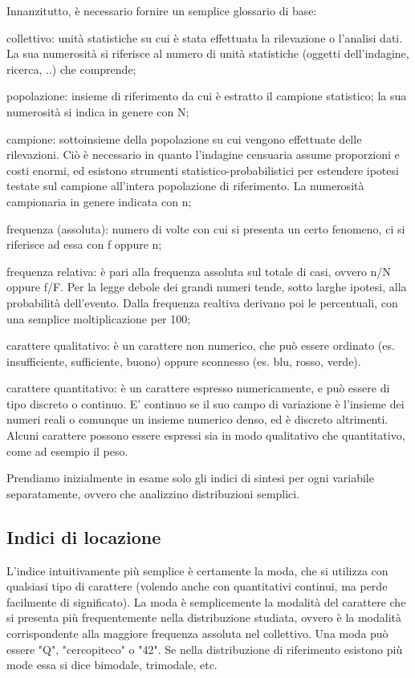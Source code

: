 \documentclass[a4paper]{article}
\begin{document}
Innanzitutto, \`{e} necessario fornire un semplice glossario di base:
\begin{list}{*}{}
\item collettivo: unit\`{a} statistiche su cui \`{e} stata effettuata la rilevazione o l'analisi dati. La sua numerosit\`{a} si riferisce al numero di unit\`{a} statistiche (oggetti dell'indagine, ricerca, ..) che comprende;
\item popolazione: insieme di riferimento da cui \`{e} estratto il campione statistico; la sua numerosit\`{a} si indica in genere con N;
\item campione: sottoinsieme della popolazione su cui vengono effettuate delle rilevazioni. Ciò \`{e} necessario in quanto l'indagine censuaria assume proporzioni e costi enormi, ed esistono strumenti statistico-probabilistici per estendere ipotesi testate sul campione all'intera popolazione di riferimento. La numerosit\`{a} campionaria in genere indicata con n;
\item frequenza (assoluta): numero di volte con cui si presenta un certo fenomeno, ci si riferisce ad essa con f oppure n;
\item frequenza relativa: \`{e} pari alla frequenza assoluta sul totale di casi, ovvero n/N oppure f/F. Per la legge debole dei grandi numeri tende, sotto larghe ipotesi, alla probabilit\`{a} dell'evento. Dalla frequenza realtiva derivano poi le percentuali, con una semplice moltiplicazione per 100;
\item carattere qualitativo: \`{e} un carattere non numerico, che può essere ordinato (es. insufficiente, sufficiente, buono) oppure sconnesso (es. blu, rosso, verde).
\item carattere quantitativo: \`{e} un carattere espresso numericamente, e può essere di tipo discreto o continuo. E' continuo se il suo campo di variazione \`{e} l'insieme dei numeri reali o comunque un insieme numerico denso, ed \`{e} discreto altrimenti. Alcuni carattere possono essere espressi sia in modo qualitativo che quantitativo, come ad esempio il peso.
\end{list}

Prendiamo inizialmente in esame solo gli indici di sintesi per ogni variabile separatamente, ovvero che analizzino distribuzioni semplici.

\subsection{Indici di locazione}

L'indice intuitivamente più semplice \`{e} certamente la moda, che si utilizza con qualsiasi tipo di carattere (volendo anche con quantitativi continui, ma perde facilmente di significato).
La moda \`{e} semplicemente la modalit\`{a} del carattere che si presenta più frequentemente nella distribuzione studiata, ovvero \`{e} la modalit\`{a} corrispondente alla maggiore frequenza assoluta nel collettivo.
Una moda può essere "Q", "cercopiteco" o "42". Se nella distribuzione di riferimento esistono più mode essa si dice bimodale, trimodale, etc.
\end{document}
